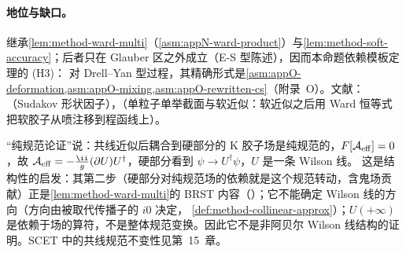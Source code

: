 \paragraph{地位与缺口。}继承\cref{lem:method-ward-multi}（\cref{asm:appN-ward-product}）与\cref{lem:method-soft-accuracy}；后者只在 Glauber 区之外成立（E-S 型陈述），因而本命题依赖模板定理的 (H3)：
对 Drell--Yan 型过程，其精确形式是\cref{asm:appO-deformation,asm:appO-mixing,asm:appO-rewritten-cs}（附录~O）。文献：\cite[第~10.8~节]{Collins2011}（Sudakov 形状因子），\cite[第~9.2~节]{CollinsSoperSterman1989}（单粒子单举截面与软近似：软近似之后用 Ward 恒等式把软胶子从喷注移到程函线上）。

\begin{remark}[纯规范论证的地位]\label{rem:method-pure-gauge}
“纯规范论证”说：共线近似后耦合到硬部分的 K 胶子场是纯规范的，$F[\mathcal A_{\rm eff}]=0$，故 $\mathcal A_{\rm eff}=-\frac\ii g(\partial U)U^\dagger$，硬部分看到 $\psi\to U^\dagger\psi$，$U$ 是一条 Wilson 线。
这是结构性的启发：其第二步（硬部分对纯规范场的依赖就是这个规范转动，含鬼场贡献）正是\cref{lem:method-ward-multi}的 BRST 内容（\tagA）；它不能确定 Wilson 线的方向（方向由被取代传播子的 $i0$ 决定，
\cref{def:method-collinear-approx}）；$U(+\infty)$ 是依赖于场的算符，不是整体规范变换。因此它不是非阿贝尔 Wilson 线结构的证明。SCET 中的共线规范不变性见第~15~章。
\end{remark}
